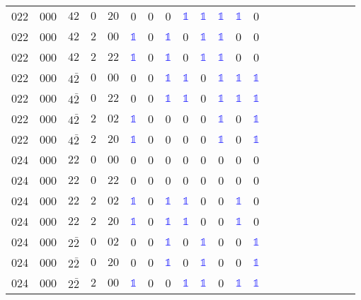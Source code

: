 \begin{longtable*}{c| cccccccccccccccccccc }
022& 000& $42$& $0$& $20$& 0& 0& 0& \textcolor{blue}{$\mathds{1}$}& \textcolor{blue}{$\mathds{1}$}& \textcolor{blue}{$\mathds{1}$}& \textcolor{blue}{$\mathds{1}$}& 0\\
022& 000& $42$& $2$& $00$& \textcolor{blue}{$\mathds{1}$}& 0& \textcolor{blue}{$\mathds{1}$}& 0& \textcolor{blue}{$\mathds{1}$}& \textcolor{blue}{$\mathds{1}$}& 0& 0\\
022& 000& $42$& $2$& $22$& \textcolor{blue}{$\mathds{1}$}& 0& \textcolor{blue}{$\mathds{1}$}& 0& \textcolor{blue}{$\mathds{1}$}& \textcolor{blue}{$\mathds{1}$}& 0& 0\\
022& 000& $4\bar{2}$& $0$& $00$& 0& 0& \textcolor{blue}{$\mathds{1}$}& \textcolor{blue}{$\mathds{1}$}& 0& \textcolor{blue}{$\mathds{1}$}& \textcolor{blue}{$\mathds{1}$}& \textcolor{blue}{$\mathds{1}$}\\
022& 000& $4\bar{2}$& $0$& $22$& 0& 0& \textcolor{blue}{$\mathds{1}$}& \textcolor{blue}{$\mathds{1}$}& 0& \textcolor{blue}{$\mathds{1}$}& \textcolor{blue}{$\mathds{1}$}& \textcolor{blue}{$\mathds{1}$}\\
022& 000& $4\bar{2}$& $2$& $02$& \textcolor{blue}{$\mathds{1}$}& 0& 0& 0& 0& \textcolor{blue}{$\mathds{1}$}& 0& \textcolor{blue}{$\mathds{1}$}\\
022& 000& $4\bar{2}$& $2$& $20$& \textcolor{blue}{$\mathds{1}$}& 0& 0& 0& 0& \textcolor{blue}{$\mathds{1}$}& 0& \textcolor{blue}{$\mathds{1}$}\\
024& 000& $22$& $0$& $00$& 0& 0& 0& 0& 0& 0& 0& 0\\
024& 000& $22$& $0$& $22$& 0& 0& 0& 0& 0& 0& 0& 0\\
024& 000& $22$& $2$& $02$& \textcolor{blue}{$\mathds{1}$}& 0& \textcolor{blue}{$\mathds{1}$}& \textcolor{blue}{$\mathds{1}$}& 0& 0& \textcolor{blue}{$\mathds{1}$}& 0\\
024& 000& $22$& $2$& $20$& \textcolor{blue}{$\mathds{1}$}& 0& \textcolor{blue}{$\mathds{1}$}& \textcolor{blue}{$\mathds{1}$}& 0& 0& \textcolor{blue}{$\mathds{1}$}& 0\\
024& 000& $2\bar{2}$& $0$& $02$& 0& 0& \textcolor{blue}{$\mathds{1}$}& 0& \textcolor{blue}{$\mathds{1}$}& 0& 0& \textcolor{blue}{$\mathds{1}$}\\
024& 000& $2\bar{2}$& $0$& $20$& 0& 0& \textcolor{blue}{$\mathds{1}$}& 0& \textcolor{blue}{$\mathds{1}$}& 0& 0& \textcolor{blue}{$\mathds{1}$}\\
024& 000& $2\bar{2}$& $2$& $00$& \textcolor{blue}{$\mathds{1}$}& 0& 0& \textcolor{blue}{$\mathds{1}$}& \textcolor{blue}{$\mathds{1}$}& 0& \textcolor{blue}{$\mathds{1}$}& \textcolor{blue}{$\mathds{1}$}\\

\end{longtable*}
